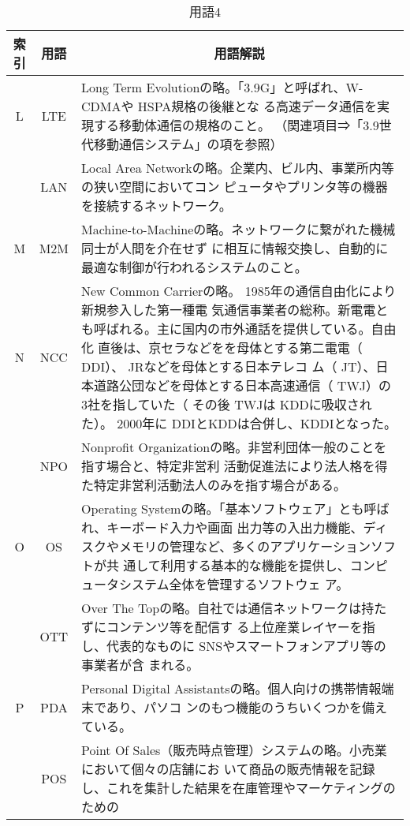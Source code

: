 \begin{table}[htb]
  \begin{center}
    \caption{用語4}
    \begin{tabular}{|c|c|p{12cm}|}
      \hline
      索引 & 用語 & \multicolumn{1}{c|}{用語解説} \\
      \hline
      L & LTE & Long Term Evolutionの略。「3.9G」と呼ばれ、W-CDMAや HSPA規格の後継とな
      る高速データ通信を実現する移動体通信の規格のこと。 
      （関連項目⇒「3.9世代移動通信システム」の項を参照）\\
      \cline{2-3}
      & LAN & Local Area Networkの略。企業内、ビル内、事業所内等の狭い空間においてコン
      ピュータやプリンタ等の機器を接続するネットワーク。 \\
      \hline
      M & M2M & Machine-to-Machineの略。ネットワークに繋がれた機械同士が人間を介在せず
      に相互に情報交換し、自動的に最適な制御が行われるシステムのこと。 \\
      \hline
      N & NCC & New Common Carrierの略。 1985年の通信自由化により新規参入した第一種電
      気通信事業者の総称。新電電とも呼ばれる。主に国内の市外通話を提供している。自由化
      直後は、京セラなどをを母体とする第二電電（ DDI）、 JRなどを母体とする日本テレコ
      ム（ JT）、日本道路公団などを母体とする日本高速通信（ TWJ）の 3社を指していた（
        その後 TWJは KDDに吸収された）。 2000年に DDIとKDDは合併し、KDDIとなった。 \\
      \cline{2-3}
      & NPO & Nonprofit Organizationの略。非営利団体一般のことを指す場合と、特定非営利
      活動促進法により法人格を得た特定非営利活動法人のみを指す場合がある。 \\
      \hline
      O &  
      OS & Operating Systemの略。「基本ソフトウェア」とも呼ばれ、キーボード入力や画面
      出力等の入出力機能、ディスクやメモリの管理など、多くのアプリケーションソフトが共
      通して利用する基本的な機能を提供し、コンピュータシステム全体を管理するソフトウェ
      ア。 \\
      \cline{2-3}
      & OTT & Over The Topの略。自社では通信ネットワークは持たずにコンテンツ等を配信す
      る上位産業レイヤーを指し、代表的なものに SNSやスマートフォンアプリ等の事業者が含
      まれる。 \\
      \hline
      P & PDA & Personal Digital Assistantsの略。個人向けの携帯情報端末であり、パソコ
      ンのもつ機能のうちいくつかを備えている。 \\
      \cline{2-3}
      & POS & Point Of Sales（販売時点管理）システムの略。小売業において個々の店舗にお
      いて商品の販売情報を記録し、これを集計した結果を在庫管理やマーケティングのための

\end{tabular}
\end{center}
\end{table}
